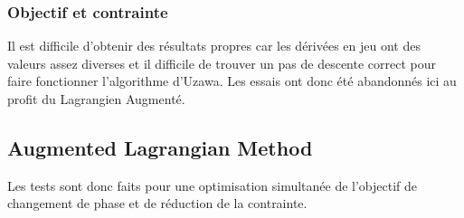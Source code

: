 \documentclass[11pt,a4paper]{article}
\begin{document}
%	
%	
%	
%	



\subsubsection*{Objectif et contrainte}
Il est difficile d'obtenir des résultats propres car les dérivées en jeu ont des valeurs assez diverses et il difficile de trouver un pas de descente correct pour faire fonctionner l'algorithme d'Uzawa. Les essais ont donc été abandonnés ici au profit du Lagrangien Augmenté.


\subsection*{Augmented Lagrangian Method}
\newcommand\FichierALM{/Users/mathilde/These/Projets/OptimisationTrajectoire/LignesDroites/NbLignesNonFixe/LignesEquidistantes/deuxVariables/SansAdjoint/Rectangle/AugmentedLagrangian/ResultatsTests/Tout/}

Les tests sont donc faits pour une optimisation simultanée de l'objectif de changement de phase et de réduction de la contrainte.
\end{document}
